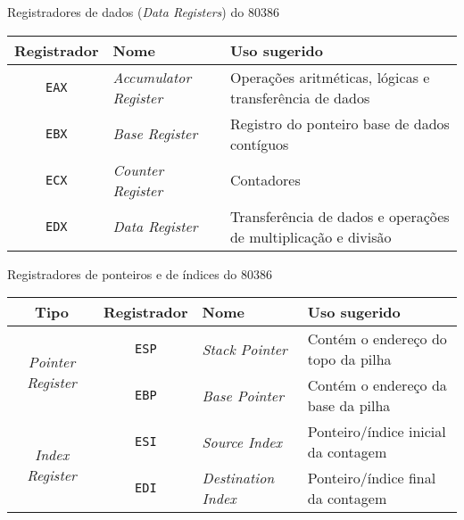 \begin{frame}[fragile]{Registradores de dados ({\it Data Registers}) do 80386}

    \begin{table}[ht]
        \centering

        \begin{tabularx}{\textwidth}{clX}
            \toprule
            \textbf{Registrador} & \textbf{Nome} & \textbf{Uso sugerido} \\
            \midrule
            \texttt{EAX} & \textit{Accumulator Register} & Operações aritméticas, lógicas e 
                                                            transferência de dados \\
            \midrule
            \texttt{EBX} & \textit{Base Register} & Registro do ponteiro base de dados contíguos \\
            \midrule
            \texttt{ECX} & \textit{Counter Register} & Contadores \\
            \midrule
            \texttt{EDX} & \textit{Data Register} & Transferência de dados e operações de multiplicação e divisão \\
            \bottomrule
        \end{tabularx}
    \end{table}

\end{frame}

\begin{frame}[fragile]{Registradores de ponteiros e de índices do 80386}

    \begin{table}[ht]
        \centering

        \begin{tabularx}{1.01\textwidth}{cclX}
            \toprule
            \textbf{Tipo} & \textbf{Registrador} & \textbf{Nome} & \textbf{Uso sugerido} \\
            \midrule
            \multirow{2}{*}[-2em]{\it Pointer Register} & \texttt{ESP} & \textit{Stack Pointer} & Contém 
                                                    o endereço do topo da pilha \\
            & \cellcolor[gray]{0.9}\texttt{EBP} & \cellcolor[gray]{0.9}\textit{Base Pointer} & \cellcolor[gray]{0.9}Contém o endereço da base da pilha \\
            \midrule
            \multirow{2}{*}[-2em]{\it Index Register} & \texttt{ESI} & \textit{Source Index} & 
                Ponteiro/índice inicial da contagem  \\
            & \cellcolor[gray]{0.9}\texttt{EDI} & \cellcolor[gray]{0.9}\textit{Destination Index} &
                \cellcolor[gray]{0.9} Ponteiro/índice final da contagem \\
            \bottomrule
        \end{tabularx}
    \end{table}

\end{frame}
